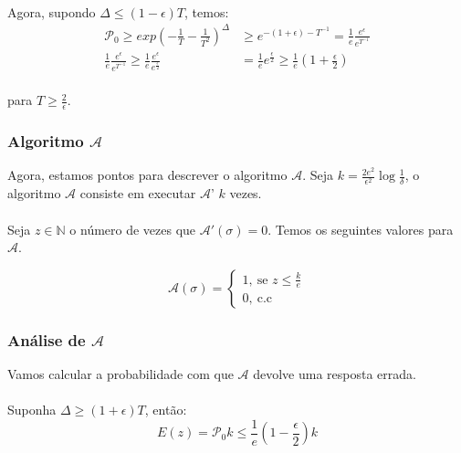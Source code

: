 \paragraph{}Agora, supondo $\Delta \leq (1-\epsilon)T$, temos:
\begin{align*}
    \mathcal{P}_0 \geq exp(-\frac{1}{T}-\frac{1}{T^2})^\Delta &\geq e ^{-(1+\epsilon)-T^{-1}} = \frac{1}{e}\frac{e^\epsilon}{e^{T^{-1}}}\\
    \frac{1}{e}\frac{e^\epsilon}{e^{T^{-1}}} \geq \frac{1}{e}\frac{e^\epsilon}{e^\frac{\epsilon}{2}} &=\frac{1}{e}e^\frac{\epsilon}{2} \geq \frac{1}{e}\left(1+\frac{\epsilon}{2}\right)
\end{align*}
\paragraph{}para $T \geq \frac{2}{\epsilon}$.
\pagebreak
\subsubsection{Algoritmo $\mathcal{A}$}
Agora, estamos pontos para descrever o algoritmo $\mathcal{A}$. Seja $k =\frac{2e^2}{\epsilon^2}\log{\frac{1}{\delta}}$, o algoritmo $\mathcal{A}$ consiste em executar $\mathcal{A}$' $k$ vezes. 
\paragraph{}Seja $z \in \mathbb{N}$ o número de vezes que $\mathcal{A}'(\sigma)=0$. Temos os seguintes valores para $\mathcal{A}$.

\[
   \mathcal{A}(\sigma) = \begin{cases} 
                    1,\ \text{se }z \leq \frac{k}{e}\\ 
                    0,\ \text{c.c}\end{cases}
\]

\subsubsection{Análise de $\mathcal{A}$}
Vamos calcular a probabilidade com que $\mathcal{A}$ devolve uma resposta errada.
\paragraph{} Suponha $\Delta \geq \left(1+\epsilon\right)T$, então:
\begin{equation*}
E(z) = \mathcal{P}_0 k \leq \frac{1}{e}\left(1-\frac{\epsilon}{2}\right)k    
\end{equation*}
